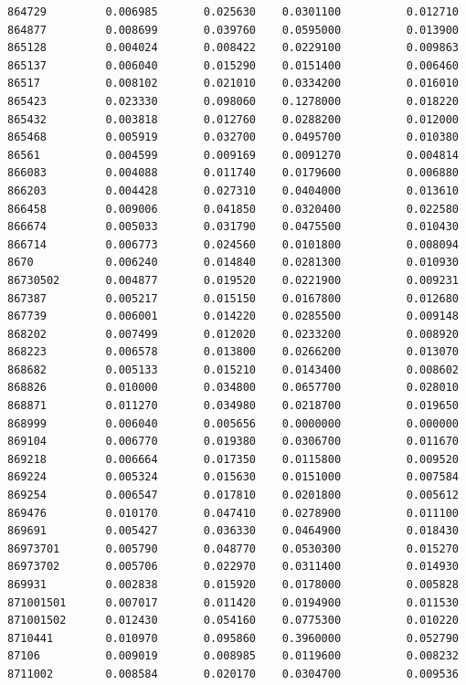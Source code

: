 \documentclass[
  letterpaper,
  DIV=11,
  numbers=noendperiod]{scrartcl}
\begin{document}
\begin{verbatim}
864729         0.006985       0.025630    0.0301100          0.012710
864877         0.008699       0.039760    0.0595000          0.013900
865128         0.004024       0.008422    0.0229100          0.009863
865137         0.006040       0.015290    0.0151400          0.006460
86517          0.008102       0.021010    0.0334200          0.016010
865423         0.023330       0.098060    0.1278000          0.018220
865432         0.003818       0.012760    0.0288200          0.012000
865468         0.005919       0.032700    0.0495700          0.010380
86561          0.004599       0.009169    0.0091270          0.004814
866083         0.004088       0.011740    0.0179600          0.006880
866203         0.004428       0.027310    0.0404000          0.013610
866458         0.009006       0.041850    0.0320400          0.022580
866674         0.005033       0.031790    0.0475500          0.010430
866714         0.006773       0.024560    0.0101800          0.008094
8670           0.006240       0.014840    0.0281300          0.010930
86730502       0.004877       0.019520    0.0221900          0.009231
867387         0.005217       0.015150    0.0167800          0.012680
867739         0.006001       0.014220    0.0285500          0.009148
868202         0.007499       0.012020    0.0233200          0.008920
868223         0.006578       0.013800    0.0266200          0.013070
868682         0.005133       0.015210    0.0143400          0.008602
868826         0.010000       0.034800    0.0657700          0.028010
868871         0.011270       0.034980    0.0218700          0.019650
868999         0.006040       0.005656    0.0000000          0.000000
869104         0.006770       0.019380    0.0306700          0.011670
869218         0.006664       0.017350    0.0115800          0.009520
869224         0.005324       0.015630    0.0151000          0.007584
869254         0.006547       0.017810    0.0201800          0.005612
869476         0.010170       0.047410    0.0278900          0.011100
869691         0.005427       0.036330    0.0464900          0.018430
86973701       0.005790       0.048770    0.0530300          0.015270
86973702       0.005706       0.022970    0.0311400          0.014930
869931         0.002838       0.015920    0.0178000          0.005828
871001501      0.007017       0.011420    0.0194900          0.011530
871001502      0.012430       0.054160    0.0775300          0.010220
8710441        0.010970       0.095860    0.3960000          0.052790
87106          0.009019       0.008985    0.0119600          0.008232
8711002        0.008584       0.020170    0.0304700          0.009536

\end{verbatim}
\end{document}
